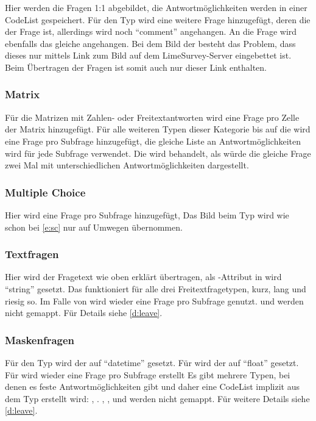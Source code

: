 Hier werden die Fragen 1:1 abgebildet, die Antwortmöglichkeiten werden in einer CodeList gespeichert.
Für den Typ  wird eine weitere Frage hinzugefügt, deren  die  der Frage ist, allerdings wird noch \enquote{comment} angehangen.
An die Frage wird ebenfalls das gleiche angehangen.
Bei dem Bild der  besteht das Problem, dass dieses nur mittels Link zum Bild auf dem LimeSurvey-Server eingebettet ist.
Beim Übertragen der Fragen ist somit auch nur dieser Link enthalten.

\subsubsection{Matrix}

Für die Matrizen mit Zahlen- oder Freitextantworten wird eine Frage pro Zelle der Matrix hinzugefügt.
Für alle weiteren Typen dieser Kategorie bis auf die  wird eine Frage pro Subfrage hinzugefügt, die gleiche Liste an Antwortmöglichkeiten wird für jede Subfrage verwendet.
Die  wird behandelt, als würde die gleiche Frage zwei Mal mit unterschiedlichen Antwortmöglichkeiten dargestellt.

\subsubsection{Multiple Choice}

Hier wird eine Frage pro Subfrage hinzugefügt, %
Das Bild beim Typ  wird wie schon bei \cref{e:sc} nur auf Umwegen übernommen.

\subsubsection{Textfragen}

Hier wird der Fragetext wie oben erklärt übertragen, als -Attribut in  wird \enquote{string} gesetzt.
Das funktioniert für alle drei Freitextfragetypen, kurz, lang und riesig so.
Im Falle von  wird wieder eine Frage pro Subfrage genutzt.
 und  werden nicht gemappt. Für Details siehe \cref{d:leave}.

\subsubsection{Maskenfragen}

Für den Typ  wird der  auf \enquote{datetime} gesetzt.
Für  wird der  auf \enquote{float} gesetzt. %
Für  wird wieder eine Frage pro Subfrage erstellt %
Es gibt mehrere Typen, bei denen es feste Antwortmöglichkeiten gibt und daher eine CodeList implizit aus dem Typ erstellt wird:
, .
, ,  und  werden nicht gemappt. Für weitere Details siehe \cref{d:leave}.

